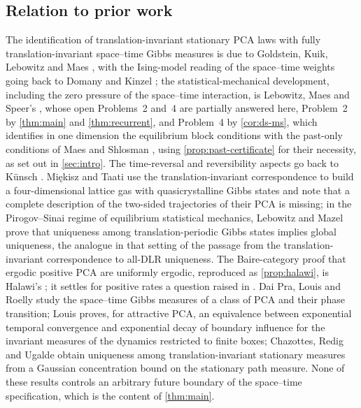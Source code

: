 \documentclass[11pt]{article}
\theoremstyle{plain}
\theoremstyle{definition}
\theoremstyle{remark}
\begin{document}
\subsection{Relation to prior work}
\label{sec:prior}

The identification of translation-invariant stationary PCA laws with fully translation-invariant space--time Gibbs measures is due to Goldstein, Kuik, Lebowitz and Maes \cite{GKLM89}, with the Ising-model reading of the space--time weights going back to Domany and Kinzel \cite{DK84}; the statistical-mechanical development, including the zero pressure of the space--time interaction, is Lebowitz, Maes and Speer's \cite{LMS90}, whose open Problems~2 and~4 \cite[Section~6.6]{LMS90} are partially answered here, Problem~2 by \cref{thm:main} and \cref{thm:recurrent}, and Problem~4 by \cref{cor:ds-ms}, which identifies in one dimension the equilibrium block conditions with the past-only conditions of Maes and Shlosman \cite{MS91}, using \cref{prop:past-certificate} for their necessity, as set out in \cref{sec:intro}. The time-reversal and reversibility aspects go back to K\"unsch \cite{Kunsch84}. Mi\k{e}kisz and Taati \cite{MT25} use the translation-invariant correspondence to build a four-dimensional lattice gas with quasicrystalline Gibbs states and note that a complete description of the two-sided trajectories of their PCA is missing; in the Pirogov--Sinai regime of equilibrium statistical mechanics, Lebowitz and Mazel \cite{LM97} prove that uniqueness among translation-periodic Gibbs states implies global uniqueness, the analogue in that setting of the passage from the translation-invariant correspondence to all-DLR uniqueness. The Baire-category proof that ergodic positive PCA are uniformly ergodic, reproduced as \cref{prop:halawi}, is Halawi's \cite{Halawi22}; it settles for positive rates a question raised in \cite[Section~2.2]{MSTaati19}. Dai Pra, Louis and Roelly \cite{DLR02} study the space--time Gibbs measures of a class of PCA and their phase transition; Louis \cite{Louis04} proves, for attractive PCA, an equivalence between exponential temporal convergence and exponential decay of boundary influence for the invariant measures of the dynamics restricted to finite boxes; Chazottes, Redig and Ugalde \cite{CRU25} obtain uniqueness among translation-invariant stationary measures from a Gaussian concentration bound on the stationary path measure. None of these results controls an arbitrary future boundary of the space--time specification, which is the content of \cref{thm:main}.
\end{document}
